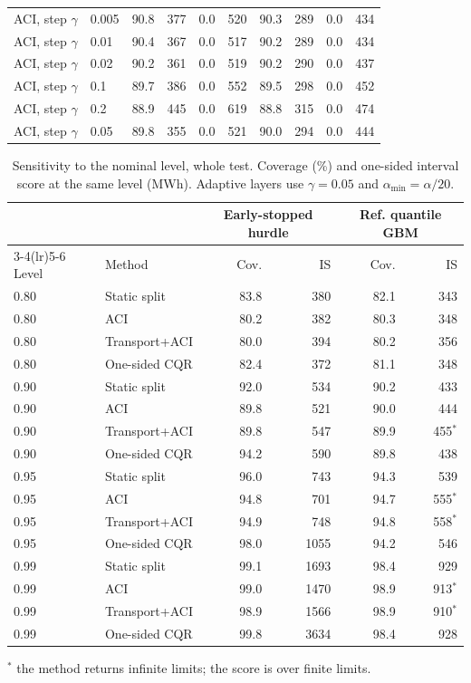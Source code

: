 \begin{table}[tp]
\begin{tabular}{ll rrrr rrrr}
\midrule
ACI, step $\gamma$ & 0.005 & 90.8 & 377 & 0.0 & 520 & 90.3 & 289 & 0.0 & 434 \\
ACI, step $\gamma$ & 0.01 & 90.4 & 367 & 0.0 & 517 & 90.2 & 289 & 0.0 & 434 \\
ACI, step $\gamma$ & 0.02 & 90.2 & 361 & 0.0 & 519 & 90.2 & 290 & 0.0 & 437 \\
ACI, step $\gamma$ & 0.1 & 89.7 & 386 & 0.0 & 552 & 89.5 & 298 & 0.0 & 452 \\
ACI, step $\gamma$ & 0.2 & 88.9 & 445 & 0.0 & 619 & 88.8 & 315 & 0.0 & 474 \\
ACI, step $\gamma$ & 0.05 & 89.8 & 355 & 0.0 & 521 & 90.0 & 294 & 0.0 & 444 \\
\bottomrule
\end{tabular}
\end{table}

\begin{table}[tp]
\centering
\footnotesize
\caption{Sensitivity to the nominal level, whole test. Coverage (\%) and one-sided interval score at the same level (MWh). Adaptive layers use $\gamma=0.05$ and $\alpha_{\min}=\alpha/20$.}
\label{tab:sens_nivel}
\begin{tabular}{l l rr rr}
\toprule
 & & \multicolumn{2}{c}{Early-stopped hurdle} & \multicolumn{2}{c}{Ref. quantile GBM} \\
\cmidrule(lr){3-4}\cmidrule(lr){5-6}
Level & Method & Cov. & IS & Cov. & IS \\
\midrule
0.80 & Static split & 83.8 & 380 & 82.1 & 343 \\
0.80 & ACI & 80.2 & 382 & 80.3 & 348 \\
0.80 & Transport+ACI & 80.0 & 394 & 80.2 & 356 \\
0.80 & One-sided CQR & 82.4 & 372 & 81.1 & 348 \\
0.90 & Static split & 92.0 & 534 & 90.2 & 433 \\
0.90 & ACI & 89.8 & 521 & 90.0 & 444 \\
0.90 & Transport+ACI & 89.8 & 547 & 89.9 & 455$^\ast$ \\
0.90 & One-sided CQR & 94.2 & 590 & 89.8 & 438 \\
0.95 & Static split & 96.0 & 743 & 94.3 & 539 \\
0.95 & ACI & 94.8 & 701 & 94.7 & 555$^\ast$ \\
0.95 & Transport+ACI & 94.9 & 748 & 94.8 & 558$^\ast$ \\
0.95 & One-sided CQR & 98.0 & 1055 & 94.2 & 546 \\
0.99 & Static split & 99.1 & 1693 & 98.4 & 929 \\
0.99 & ACI & 99.0 & 1470 & 98.9 & 913$^\ast$ \\
0.99 & Transport+ACI & 98.9 & 1566 & 98.9 & 910$^\ast$ \\
0.99 & One-sided CQR & 99.8 & 3634 & 98.4 & 928 \\
\bottomrule
\end{tabular}

\smallskip\parbox{0.95\linewidth}{\scriptsize $^\ast$ the method returns infinite limits; the score is over finite limits.}
\end{table}

